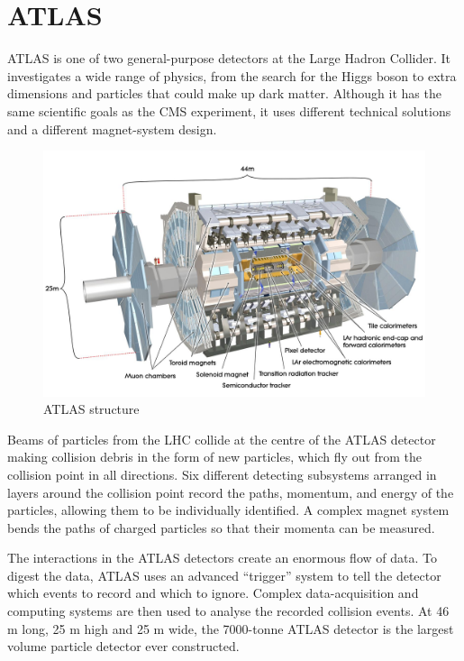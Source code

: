 \documentclass[a4paper, oneside, 11pt, openright]{book}
\begin{document}
		\section{ATLAS}	
			ATLAS \cite{ATLAS config} is one of two general-purpose detectors at the Large Hadron Collider. It investigates a wide range of physics, from the search for the Higgs boson to extra dimensions and particles that could make up dark matter. Although it has the same scientific goals as the CMS experiment, it uses different technical solutions and a different magnet-system design.
			\begin{figure}[H]
				\centering
				\includegraphics[width=0.6\textheight]{tesi_images/atlas_structure.jpg}
				\caption{ATLAS structure}
				\label{fig:ATLAS structure}
			\end{figure}
		
			Beams of particles from the LHC collide at the centre of the ATLAS detector making collision debris in the form of new particles, which fly out from the collision point in all directions. Six different detecting subsystems arranged in layers around the collision point record the paths, momentum, and energy of the particles, allowing them to be individually identified. A complex magnet system bends the paths of charged particles so that their momenta can be measured.
		
			The interactions in the ATLAS detectors create an enormous flow of data. To digest the data, ATLAS uses an advanced “trigger” system to tell the detector which events to record and which to ignore. Complex data-acquisition and computing systems are then used to analyse the recorded collision events. At 46 m long, 25 m high and 25 m wide, the 7000-tonne ATLAS detector is the largest volume particle detector ever constructed. 
\end{document}
